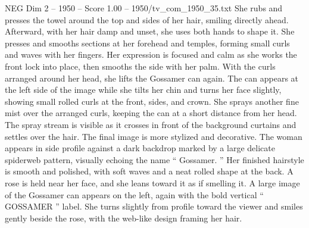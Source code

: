 \begin{textsample}{NEG Dim 2 – 1950 – Score 1.00 – 1950/tv\_com\_1950\_35.txt}
She rubs and presses the towel around the top and sides of her hair, smiling directly ahead.
Afterward, with her hair damp and unset, she uses both hands to shape it.
She presses and smooths sections at her forehead and temples, forming small curls and waves with her fingers.
Her expression is focused and calm as she works the front lock into place, then smooths the side with her palm.
With the curls arranged around her head, she lifts the Gossamer can again.
The can appears at the left side of the image while she tilts her chin and turns her face slightly, showing small rolled curls at the front, sides, and crown.
She sprays another fine mist over the arranged curls, keeping the can at a short distance from her head.
The spray stream is visible as it crosses in front of the background curtains and settles over the hair.
The final image is more stylized and decorative.
The woman appears in side profile against a dark backdrop marked by a large delicate spiderweb pattern, visually echoing the name “ Gossamer. ” Her finished hairstyle is smooth and polished, with soft waves and a neat rolled shape at the back.
A rose is held near her face, and she leans toward it as if smelling it.
A large image of the Gossamer can appears on the left, again with the bold vertical “ GOSSAMER ” label.
She turns slightly from profile toward the viewer and smiles gently beside the rose, with the web-like design framing her hair.

\end{textsample}
